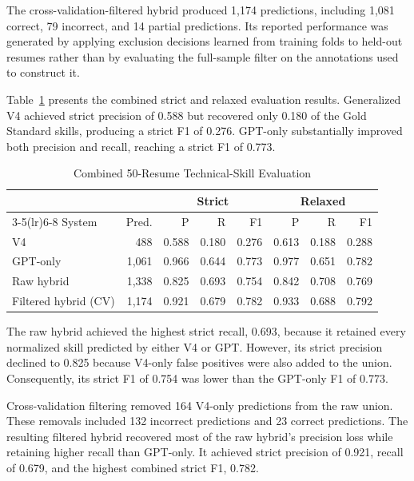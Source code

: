 \documentclass[conference]{IEEEtran}
\begin{document}
The cross-validation-filtered hybrid produced 1,174 predictions,
including 1,081 correct, 79 incorrect, and 14 partial predictions.
Its reported performance was generated by applying exclusion decisions
learned from training folds to held-out resumes rather than by evaluating
the full-sample filter on the annotations used to construct it.

Table~\ref{tab:system_comparison_50} presents the combined strict and
relaxed evaluation results. Generalized V4 achieved strict precision of
0.588 but recovered only 0.180 of the Gold Standard skills, producing a
strict F1 of 0.276. GPT-only substantially improved both precision and
recall, reaching a strict F1 of 0.773.

\begin{table}[t]
\caption{Combined 50-Resume Technical-Skill Evaluation}
\label{tab:system_comparison_50}
\centering
\scriptsize
\setlength{\tabcolsep}{2.0pt}
\begin{tabular}{lrrrrrrr}
\toprule
& & \multicolumn{3}{c}{Strict} &
\multicolumn{3}{c}{Relaxed} \\
\cmidrule(lr){3-5}\cmidrule(lr){6-8}
System & Pred. & P & R & F1 & P & R & F1 \\
\midrule
V4 & 488 & 0.588 & 0.180 & 0.276 &
0.613 & 0.188 & 0.288 \\
GPT-only & 1,061 & 0.966 & 0.644 & 0.773 &
0.977 & 0.651 & 0.782 \\
Raw hybrid & 1,338 & 0.825 & 0.693 & 0.754 &
0.842 & 0.708 & 0.769 \\
Filtered hybrid (CV) & 1,174 & 0.921 & 0.679 & 0.782 &
0.933 & 0.688 & 0.792 \\
\bottomrule
\end{tabular}
\end{table}

The raw hybrid achieved the highest strict recall, 0.693, because it
retained every normalized skill predicted by either V4 or GPT. However,
its strict precision declined to 0.825 because V4-only false positives
were also added to the union. Consequently, its strict F1 of 0.754 was
lower than the GPT-only F1 of 0.773.

Cross-validation filtering removed 164 V4-only predictions from the raw
union. These removals included 132 incorrect predictions and 23 correct
predictions. The resulting filtered hybrid recovered most of the raw
hybrid's precision loss while retaining higher recall than GPT-only. It
achieved strict precision of 0.921, recall of 0.679, and the highest
combined strict F1, 0.782.
\end{document}
